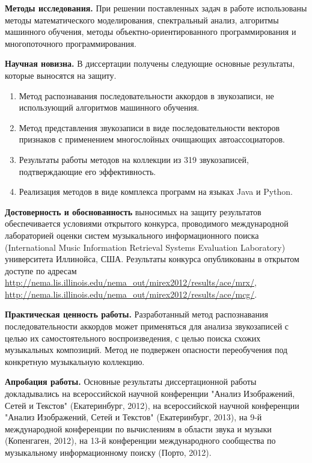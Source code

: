 \textbf{Методы исследования.} При решении поставленных задач в работе
использованы методы математического моделирования, спектральный анализ,
алгоритмы машинного обучения, методы объектно-ориентированного программирования
и многопоточного программирования.

\textbf{Научная новизна.} В диссертации получены следующие основные результаты,
которые выносятся на защиту.

\begin{enumerate}
  \item Метод распознавания последовательности аккордов в звукозаписи, не
  использующий алгоритмов машинного обучения.
  \item Метод представления звукозаписи в виде последовательности векторов
  признаков с применением многослойных очищающих автоассоциаторов.
  \item Результаты работы методов на коллекции из 319 звукозаписей,
  подтверждающие его эффективность.
  \item Реализация методов в виде комплекса программ на языках Java и Python.
\end{enumerate}

\textbf{Достоверность и обоснованность} выносимых на защиту результатов
обеспечивается условиями открытого конкурса, проводимого международной
лабораторией оценки систем музыкального информационного поиска (International
Music Information Retrieval Systems Evaluation Laboratory) университета
Иллинойса, США. Результаты конкурса опубликованы в открытом доступе по адресам
\url{http://nema.lis.illinois.edu/nema_out/mirex2012/results/ace/mrx/},
\url{http://nema.lis.illinois.edu/nema_out/mirex2012/results/ace/mcg/}.

\textbf{Практическая ценность работы.} Разработанный метод распознавания
последовательности аккордов может применяться для анализа звукозаписей с целью
их самостоятельного воспроизведения, с целью поиска схожих музыкальных
композиций. Метод не подвержен опасности переобучения под конкретную музыкальную
коллекцию.

\textbf{Апробация работы.} Основные результаты диссертационной работы
докладывались на всероссийской научной конференции "Анализ Изображений, Сетей и
Текстов" (Екатеринбург, 2012), на всероссийской научной конференции "Анализ
Изображений, Сетей и Текстов" (Екатеринбург, 2013), на 9-й международной
конференции по вычислениям в области звука и музыки (Копенгаген, 2012), на 13-й
конференции международного сообщества по музыкальному информационному поиску
(Порто, 2012).

